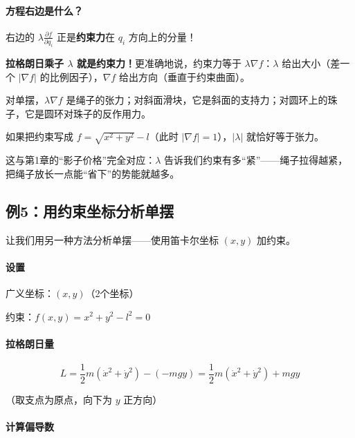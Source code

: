 \paragraph{方程右边是什么？}

右边的 $\lambda \frac{\partial f}{\partial q_i}$ 正是\textbf{约束力}在 $q_i$ 方向上的分量！

\begin{physicalmeaning}
\textbf{拉格朗日乘子 $\lambda$ 就是约束力！}更准确地说，约束力等于 $\lambda \nabla f$：$\lambda$ 给出大小（差一个 $|\nabla f|$ 的比例因子），$\nabla f$ 给出方向（垂直于约束曲面）。

对单摆，$\lambda \nabla f$ 是绳子的张力；对斜面滑块，它是斜面的支持力；对圆环上的珠子，它是圆环对珠子的反作用力。

如果把约束写成 $f = \sqrt{x^2+y^2} - l$（此时 $|\nabla f| = 1$），$|\lambda|$ 就恰好等于张力。

这与第1章的“影子价格”完全对应：$\lambda$ 告诉我们约束有多“紧”——绳子拉得越紧，把绳子放长一点能“省下”的势能就越多。
\end{physicalmeaning}

\subsection{例5：用约束坐标分析单摆}

让我们用另一种方法分析单摆——使用笛卡尔坐标 $(x, y)$ 加约束。

\paragraph{设置}

广义坐标：$(x, y)$（2个坐标）

约束：$f(x, y) = x^2 + y^2 - l^2 = 0$

\paragraph{拉格朗日量}

\[
L = \frac{1}{2}m(\dot{x}^2 + \dot{y}^2) - (-mgy) = \frac{1}{2}m(\dot{x}^2 + \dot{y}^2) + mgy
\]

（取支点为原点，向下为 $y$ 正方向）

\paragraph{计算偏导数}

